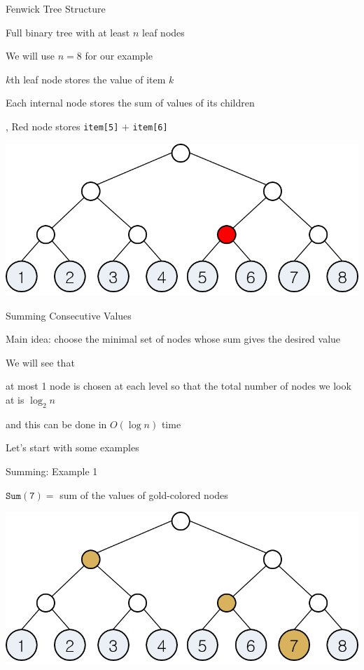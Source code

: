 \documentclass[13pt,onlymath]{beamer}
\begin{document}
\begin{frame}[fragile]{Fenwick Tree Structure}
\BIT
\item Full binary tree with at least $n$ leaf nodes
\BIT
\item We will use $n=8$ for our example
\EIT
\item $k$th leaf node stores the value of item $k$
\item Each internal node stores the sum of values of its children
\BIT
\item \eg, Red node stores \verb.item[5]. $+$ \verb.item[6].
\EIT
\EIT
\begin{center}
\includegraphics[height=0.4\textheight]{figures/fenwick.png}
\end{center}
\end{frame}

\begin{frame}{Summing Consecutive Values}
\BIT
\item Main idea: choose the minimal set of nodes whose sum gives the desired value
\item We will see that
\BIT
\item at most 1 node is chosen at each level so that the total number of nodes we look at is $\log_2 n$
\item and this can be done in $O(\log n)$ time
\EIT
\vfill
\item Let's start with some examples
\EIT
\end{frame}

\begin{frame}[fragile]{Summing: Example 1}
\BIT
\item $\mathtt{Sum(7)} = $ sum of the values of gold-colored nodes
\EIT
\begin{center}
\includegraphics[height=0.4\textheight]{figures/fenwick_sum1.png}
\end{center}
\end{frame}
\end{document}
